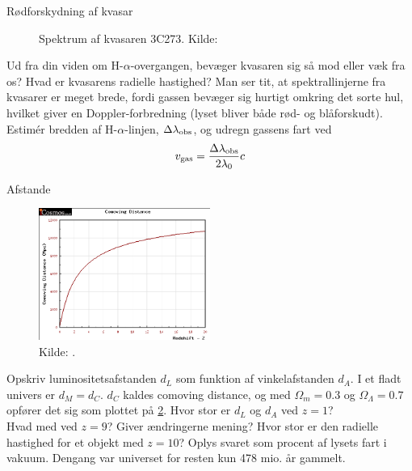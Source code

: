 \documentclass[crop=false, class=memoir]{standalone}
\begin{document}
\begin{opgave}[1]{Rødforskydning af kvasar}
\begin{figure}[]
		\caption{Spektrum af kvasaren 3C273. Kilde: \cite{YatesGardenQuasarSpectrum}} %
		\label{kvasar}
	\end{figure}
	\opg Ud fra din viden om H-$\alpha$-overgangen, bevæger kvasaren sig så mod eller væk fra os?
	\opg Hvad er kvasarens radielle hastighed?
	\opg Man ser tit, at spektrallinjerne fra kvasarer er meget brede, fordi gassen bevæger sig hurtigt omkring det sorte hul, hvilket giver en Doppler-forbredning
	(lyset bliver både rød- og blåforskudt). Estimér bredden af H-$\alpha$-linjen, $\Delta\lambda_\textup{obs}$, og udregn gassens fart ved 
	\begin{align}
		v_\textup{gas}=\frac{\Delta \lambda_\textup{obs}}{2\lambda_{0}}c
	\end{align}
\end{opgave}

\begin{opgave}[3]{Afstande} %
	\\  		
	\begin{figure}[]
			\centering
			\includegraphics[width=0.5\textwidth]{Kosmo/kosmofig/ComovingDistance.png}
			\caption{Kilde: \cite{vardanyanICosmosCosmologyCalculator}.} %
			\label{comoving} 
		\end{figure}
	\opg Opskriv luminositetsafstanden $d_L$ som funktion af vinkelafstanden $d_A$.
	\opg I et fladt univers er $d_M = d_C$. $d_C$ kaldes comoving distance, og med $\Omega_m = \num{0.3}$ og $\Omega_{\Lambda} = \num{0.7}$ opfører det sig som plottet på \cref{comoving}. 
	Hvor stor er $d_L$ og $d_A$ ved $z = 1$? \\
	Hvad med ved $z = 9$? Giver ændringerne mening?
	\opg Hvor stor er den radielle hastighed for et objekt med $z = 10$? Oplys svaret som procent af lysets fart i vakuum. Dengang var universet for resten kun  478 mio. år gammelt.
\end{opgave}
\end{document}
